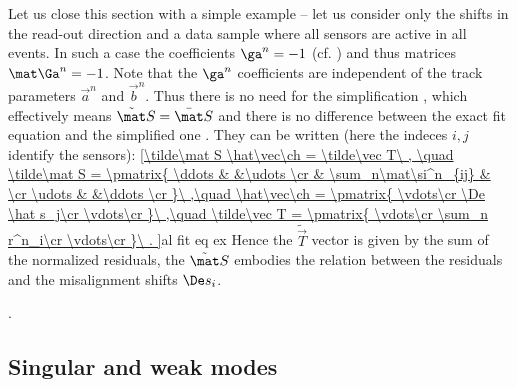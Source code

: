 Let us close this section with a simple example -- let us consider only the shifts in the read-out direction and a data sample where all sensors are active in all events. In such a case the coefficients $\ga^n = -1$ (cf. ) and thus matrices $\mat\Ga^n = -1$. Note that the $\ga^n$ coefficients are independent of the track parameters $\vec a^n$ and $\vec b^n$. Thus there is no need for the simplification , which effectively means $\tilde\mat S = \bar\mat S$ and there is no difference between the exact fit equation  and the simplified one . They can be written (here the indeces $i,j$ identify the sensors):
\eqref{\tilde\mat S \hat\vec\ch = \tilde\vec T\ , \quad
	\tilde\mat S = \pmatrix{
		\ddots	&						&\udots	\cr
				& \sum_n\mat\si^n_{ij}	&		\cr
		\udots	&						&\ddots	\cr
	}\ ,\quad
	\hat\vec\ch = \pmatrix{
		\vdots\cr
		\De \hat s_j\cr
		\vdots\cr
	}\ ,\quad
	\tilde\vec T = \pmatrix{
		\vdots\cr
		\sum_n r^n_i\cr
		\vdots\cr
	}\ .
}{al fit eq ex}
Hence the $\tilde\vec T$ vector is given by the sum of the normalized residuals, the $\tilde\mat S$ embodies the relation between the residuals and the misalignment shifts $\De s_i$.

.

\subsection[al sing modes]{Singular and weak modes}

